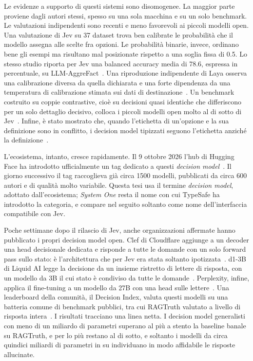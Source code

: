 Le evidenze a supporto di questi sistemi sono disomogenee. La maggior parte proviene dagli autori stessi, spesso su una
sola macchina e su un solo benchmark. Le valutazioni indipendenti sono recenti e meno favorevoli ai piccoli modelli
open. Una valutazione di Jev su 37 dataset trova ben calibrate le probabilità che il modello assegna alle scelte fra
opzioni. Le probabilità binarie, invece, ordinano bene gli esempi ma risultano mal posizionate rispetto a una soglia
fissa di 0.5. Lo stesso studio riporta per Jev una balanced accuracy media di 78.6, espressa in percentuale, su LLM-AggreFact~\cite{deusser2026jev}. Una riproduzione indipendente di Laya osserva una calibrazione diversa da
quella dichiarata e una forte dipendenza da una temperatura di calibrazione stimata sui dati di
destinazione~\cite{nandakishore2026laya}. Un benchmark costruito su coppie contrastive, cioè su decisioni quasi identiche che differiscono per un solo
dettaglio decisivo, colloca i piccoli modelli open molto al di sotto di Jev~\cite{yong2026decidebench}. Infine, è stato mostrato che, quando l'etichetta di un'opzione e la
sua definizione sono in conflitto, i decision model tipizzati seguono l'etichetta anziché la
definizione~\cite{azizi2026labels}.

L'ecosistema, intanto, cresce rapidamente. Il 9 ottobre 2026 l'hub di Hugging Face ha introdotto ufficialmente un tag
dedicato a questi \emph{decision model}~\cite{hf2026decisionmodels}. Il giorno successivo il tag raccoglieva già circa
1500 modelli, pubblicati da circa 600 autori e di qualità molto variabile. Questa tesi usa il termine
\emph{decision model}, adottato dall'ecosistema; \emph{System One} resta il nome con cui TypeSafe ha introdotto la
categoria, e compare nel seguito soltanto come nome dell'interfaccia compatibile con Jev.

Poche settimane dopo il rilascio di Jev, anche organizzazioni affermate hanno pubblicato i propri decision model open.
Clef di Cloudflare aggiunge a un decoder una head decisionale dedicata e risponde a tutte le domande con un solo
forward pass sullo stato: è l'architettura che per Jev era stata soltanto ipotizzata~\cite{cloudflare2026clef}. d1-3B di
Liquid AI legge la decisione da un insieme ristretto di lettere di risposta, con un modello da 3B il cui stato è
condiviso da tutte le domande~\cite{liquid2026d1}. Perplexity, infine, applica il fine-tuning a un modello da 27B con una
head sulle lettere~\cite{perplexity2026decider}. Una leaderboard della comunità, il Decision Index, valuta questi modelli
su una batteria comune di benchmark pubblici, tra cui RAGTruth valutato a livello di risposta
intera~\cite{decisionindex2026}. I risultati tracciano una linea netta. I decision model generalisti con meno di un
miliardo di parametri superano al più a stento la baseline banale su RAGTruth, e per lo più restano al di sotto, e soltanto i modelli da circa quindici miliardi di parametri in su individuano in modo affidabile le risposte allucinate.

